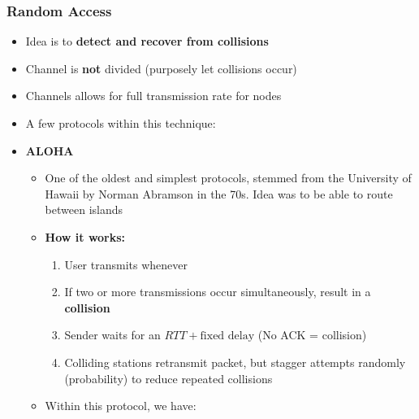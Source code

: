 \documentclass{article}
\begin{document}
\subsubsection{Random Access}
\begin{itemize}
    \item Idea is to \textbf{detect and recover from collisions}
    \item Channel is \textbf{not} divided (purposely let collisions occur)
    \item Channels allows for full transmission rate for nodes
    \item A few protocols within this technique:
    
    \item \textbf{ALOHA}
    \begin{itemize}
        \item One of the oldest and simplest protocols, stemmed from the University of Hawaii
        by Norman Abramson in the 70s. Idea was to be able to route between islands
        \item \textbf{How it works:} 
        \begin{enumerate}
            \item User transmits whenever
            \item If two or more transmissions occur simultaneously, result in a \textbf{collision}
            \item Sender waits for an $RTT+\text{fixed delay}$ (No ACK = collision)
            \item Colliding stations retransmit packet, but stagger attempts randomly (probability) to reduce 
            repeated collisions
        \end{enumerate}
        \item Within this protocol, we have:
        \end{itemize}


\end{itemize}
\end{document}
